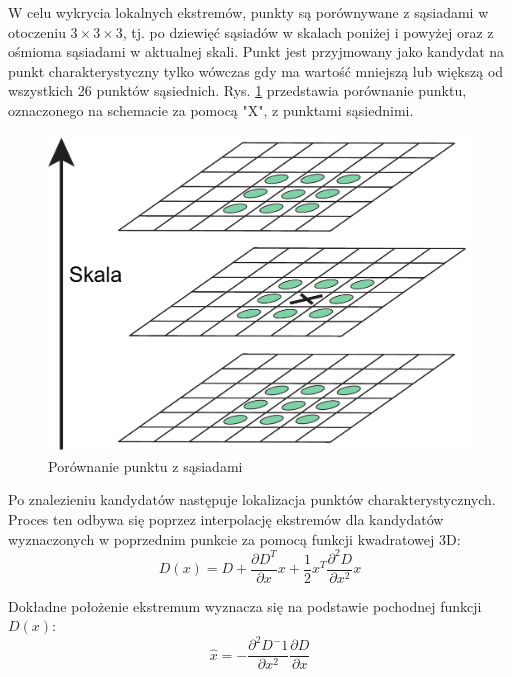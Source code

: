 W celu wykrycia lokalnych ekstremów, punkty są porównywane z sąsiadami w otoczeniu $3 \times 3 \times 3$, tj. po dziewięć sąsiadów w skalach poniżej i powyżej oraz z ośmioma sąsiadami w aktualnej skali. Punkt jest przyjmowany jako kandydat na punkt charakterystyczny tylko wówczas gdy ma wartość mniejszą lub większą od wszystkich 26 punktów sąsiednich.\cite{LOWE04} Rys. \ref{fig:sift-gaussian-min-max} przedstawia porównanie punktu, oznaczonego na schemacie za pomocą "X", z punktami sąsiednimi.

\begin{figure}[h]
	\centering
	\includegraphics[scale=0.4]{graphics/01_podstawy_teoretyczne/sift-gaussian-min-max.pdf}
	\caption{Porównanie punktu z sąsiadami \cite{LOWE04}}
	\label{fig:sift-gaussian-min-max}
\end{figure}

Po znalezieniu kandydatów następuje lokalizacja punktów charakterystycznych. Proces ten odbywa się poprzez interpolację ekstremów dla kandydatów wyznaczonych w poprzednim punkcie za pomocą funkcji kwadratowej 3D:
\begin{equation} 
\label{sift_3d} 
D(x) = D + \frac{\partial D^T}{\partial x} x + \frac{1}{2}x^T \frac{\partial^2 D}{\partial x^2} x
\end{equation}

Dokładne położenie ekstremum wyznacza się na podstawie pochodnej funkcji $D(x)$:
\begin{equation} 
\label{sift_pochodna_D} 
\hat{x} = -\frac{\partial^2 D^-1}{\partial x^2}\frac{\partial D}{\partial x}
\end{equation}

